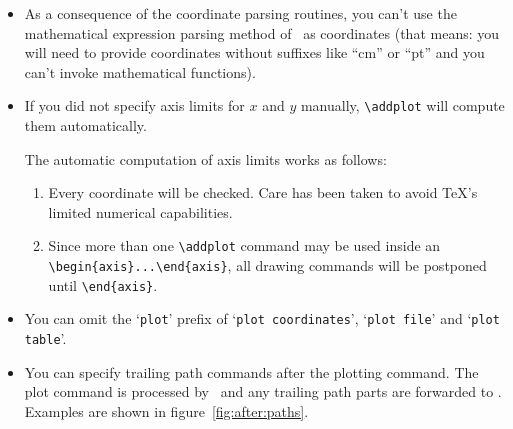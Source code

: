 \begin{itemize}
	\item As a consequence of the coordinate parsing routines, you can't use the mathematical expression parsing method of \PGF\ as coordinates (that means: you will need to provide coordinates without suffixes like ``cm'' or ``pt'' and you can't invoke mathematical functions).
	
	\item If you did not specify axis limits for $x$ and $y$ manually, \lstinline!\addplot! will compute them automatically. 

	The automatic computation of axis limits works as follows:
		\begin{enumerate}
			\item Every coordinate will be checked. Care has been taken to avoid \TeX's limited numerical capabilities.
			\item Since more than one \lstinline!\addplot! command may be used inside an \lstinline!\begin{axis}...\end{axis}!, all drawing commands will be postponed until \lstinline!\end{axis}!.
		\end{enumerate}

	\item You can omit the `\texttt{plot}' prefix of `\texttt{plot coordinates}', `\texttt{plot file}' and `\texttt{plot table}'.

	\item You can specify trailing path commands after the plotting command. The plot command is processed by \PGFPlots\ and any trailing path parts are forwarded to \Tikz. Examples are shown in figure~\ref{fig:after:paths}.
\end{itemize}
